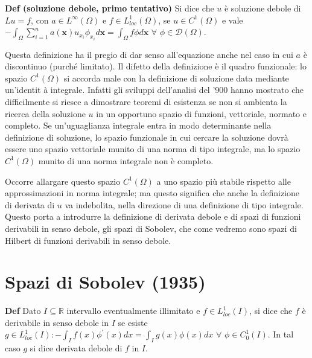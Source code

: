 \documentclass{article}
\begin{document}
\textbf{Def (soluzione debole, primo tentativo)} Si dice che $u$ \`{e}
soluzione debole di $Lu=f$, con $a\in L^{\infty }(%
\Omega
)$ e $f\in L_{loc}^{1}(%
\Omega
)$, se $u\in C^{1}(%
\Omega
)$ e vale $-\int_{\Omega }\sum_{i=1}^{n}a\left( \mathbf{x}\right)
u_{x_{i}}\phi _{x_{i}}d\mathbf{x}=\int_{\Omega }f\phi d\mathbf{x}$ $\forall $
$\phi \in \mathcal{D}(%
\Omega
)$.

Questa definizione ha il pregio di dar senso all'equazione anche nel caso in
cui $a$ \`{e} discontinuo (purch\'{e} limitato). Il difetto della
definizione \`{e} il quadro funzionale: lo spazio $C^{1}(%
\Omega
)$ si accorda male con la definizione di soluzione data mediante un'identit%
\`{a} integrale. Infatti gli sviluppi dell'analisi del '900 hanno mostrato
che difficilmente si riesce a dimostrare teoremi di esistenza se non si
ambienta la ricerca della soluzione $u$ in un opportuno spazio di funzioni,
vettoriale, normato e completo. Se un'uguaglianza integrale entra in modo
determinante nella definizione di soluzione, lo spazio funzionale in cui
cercare la soluzione dovr\`{a} essere uno spazio vettoriale munito di una
norma di tipo integrale, ma lo spazio $C^{1}(%
\Omega
)$ munito di una norma integrale non \`{e} completo.

Occorre allargare questo spazio $C^{1}(%
\Omega
)$ a uno spazio pi\`{u} stabile rispetto alle approssimazioni in norma
integrale; ma questo significa che anche la definizione di derivata di $u$
va indebolita, nella direzione di una definizione di tipo integrale. Questo
porta a introdurre la definizione di derivata debole e di spazi di funzioni
derivabili in senso debole, gli spazi di Sobolev, che come vedremo sono
spazi di Hilbert di funzioni derivabili in senso debole.

\section{Spazi di Sobolev (1935)}

\textbf{Def} Dato $I\subseteq 
\mathbb{R}
$ intervallo eventualmente illimitato e $f\in L_{loc}^{1}\left( I\right) $,
si dice che $f$ \`{e} derivabile in senso debole in $I$ se esiste $g\in
L_{loc}^{1}\left( I\right) :-\int_{I}f\left( x\right) \phi ^{\prime }\left(
x\right) dx=\int_{I}g\left( x\right) \phi \left( x\right) dx$ $\forall $ $%
\phi \in C_{0}^{1}\left( I\right) $. In tal caso $g$ si dice derivata debole
di $f$ in $I$.
\end{document}
